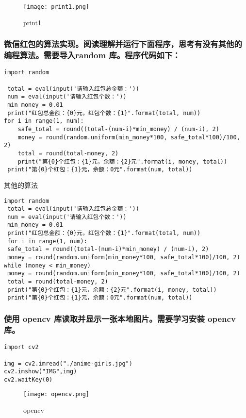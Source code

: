 \documentclass{ctexart}
\begin{document}
\begin{figure}[H]
    \centering
    \texttt{[image: print1.png]}
    \caption{print1}
    \label{fig:enter-label}
\end{figure}

\subsubsection{微信红包的算法实现。阅读理解并运行下面程序，思考有没有其他的编程算法。需要导入random 库。程序代码如下：}
\begin{lstlisting}
import random

 total = eval(input('请输入红包总金额：'))
 num = eval(input('请输入红包个数：'))
 min_money = 0.01
 print("红包总金额：{0}元，红包个数：{1}".format(total, num))
for i in range(1, num):
    safe_total = round((total-(num-i)*min_money) / (num-i), 2)
    money = round(random.uniform(min_money*100, safe_total*100)/100, 2)
    total = round(total-money, 2)
    print("第{0}个红包：{1}元，余额：{2}元".format(i, money, total))
 print("第{0}个红包：{1}元，余额：0元".format(num, total))
\end{lstlisting}

其他的算法
\begin{lstlisting}
import random
 total = eval(input('请输入红包总金额：'))
 num = eval(input('请输入红包个数：'))
 min_money = 0.01
 print("红包总金额：{0}元，红包个数：{1}".format(total, num))
 for i in range(1, num):
 safe_total = round((total-(num-i)*min_money) / (num-i), 2)
 money = round(random.uniform(min_money*100, safe_total*100)/100, 2)
while (money < min_money)
 money = round(random.uniform(min_money*100, safe_total*100)/100, 2)
 total = round(total-money, 2)
 print("第{0}个红包：{1}元，余额：{2}元".format(i, money, total))
 print("第{0}个红包：{1}元，余额：0元".format(num, total))
\end{lstlisting}


\subsubsection{使用 opencv 库读取并显示一张本地图片。需要学习安装 opencv 库。}
\begin{lstlisting}
import cv2

img = cv2.imread("./anime-girls.jpg")
cv2.imshow("IMG",img)
cv2.waitKey(0)
\end{lstlisting}

\begin{figure}[H]
    \centering
    \texttt{[image: opencv.png]}
    \caption{opencv}
    \label{fig:enter-label}
\end{figure}
\end{document}
